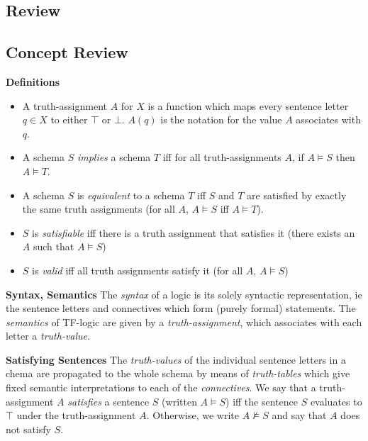 \subsection{Review}
\begin{mdframed}[linewidth=1]
\section*{Concept Review}
\textbf{Definitions}
\begin{itemize}
    \item A truth-assignment $A$ for $X$ is a function which maps every sentence letter $q \in X$ to either $\top$ or $\bot$. $A(q)$ is the notation for the value $A$ associates with $q$.

    \item A schema $S$ \emph{implies} a schema $T$ iff for all truth-assignments $A$, if $A \models S$ then $A \models T$.
    
    \item A schema $S$ is \emph{equivalent} to a schema $T$ iff $S$ and $T$ are satisfied by exactly the same truth assignments (for all $A$, $A \models S$ iff $A \models T$). 
    
    \item $S$ is \emph{satisfiable} iff there is a truth assignment that satisfies it (there exists an $A$ such that $A \models S$)
    
    \item $S$ is \emph{valid} iff all truth assignments satisfy it (for all $A$, $A \models S$)
\end{itemize}

\textbf{Syntax, Semantics}
The \emph{syntax} of a logic is its solely syntactic representation, ie the sentence letters and connectives which form (purely formal) statements. The \emph{semantics} of TF-logic are given by a \emph{truth-assignment}, which associates with each letter a \emph{truth-value}.

\textbf{Satisfying Sentences}
The \emph{truth-values} of the individual sentence letters in a chema are propagated to the whole schema by means of \emph{truth-tables} which give fixed semantic interpretations to each of the \emph{connectives}. We say that a truth-assignment $A$ \emph{satisfies} a sentence $S$ (written $A \models S$) iff the sentence $S$ evaluates to $\top$ under the truth-assignment $A$. Otherwise, we write $A \not \models S$ and say that $A$ does not satisfy $S$. 
 
\end{mdframed}




